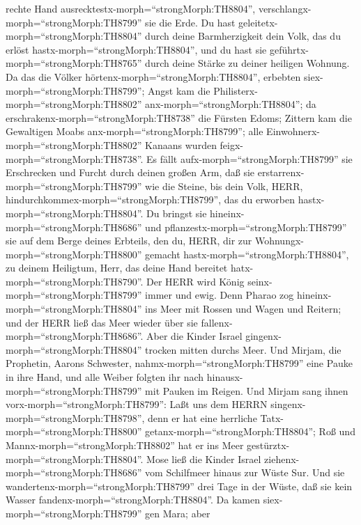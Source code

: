 rechte Hand ausrecktestx-morph=``strongMorph:TH8804'',
verschlangx-morph=``strongMorph:TH8799'' sie die Erde.  Du
hast geleitetx-morph=``strongMorph:TH8804'' durch deine Barmherzigkeit
dein Volk, das du erlöst hastx-morph=``strongMorph:TH8804'', und du hast
sie geführtx-morph=``strongMorph:TH8765'' durch deine Stärke zu deiner
heiligen Wohnung.  Da das die Völker
hörtenx-morph=``strongMorph:TH8804'', erbebten
siex-morph=``strongMorph:TH8799''; Angst kam die
Philisterx-morph=``strongMorph:TH8802''
anx-morph=``strongMorph:TH8804'';  da
erschrakenx-morph=``strongMorph:TH8738'' die Fürsten Edoms; Zittern kam
die Gewaltigen Moabs anx-morph=``strongMorph:TH8799''; alle
Einwohnerx-morph=``strongMorph:TH8802'' Kanaans wurden
feigx-morph=``strongMorph:TH8738''.  Es fällt
aufx-morph=``strongMorph:TH8799'' sie Erschrecken und Furcht durch
deinen großen Arm, daß sie erstarrenx-morph=``strongMorph:TH8799'' wie
die Steine, bis dein Volk, HERR,
hindurchkommex-morph=``strongMorph:TH8799'', das du erworben
hastx-morph=``strongMorph:TH8804''.  Du bringst sie
hineinx-morph=``strongMorph:TH8686'' und
pflanzestx-morph=``strongMorph:TH8799'' sie auf dem Berge deines
Erbteils, den du, HERR, dir zur Wohnungx-morph=``strongMorph:TH8800''
gemacht hastx-morph=``strongMorph:TH8804'', zu deinem Heiligtum, Herr,
das deine Hand bereitet hatx-morph=``strongMorph:TH8790''. 
Der HERR wird König seinx-morph=``strongMorph:TH8799'' immer und ewig.
 Denn Pharao zog hineinx-morph=``strongMorph:TH8804'' ins
Meer mit Rossen und Wagen und Reitern; und der HERR ließ das Meer wieder
über sie fallenx-morph=``strongMorph:TH8686''. Aber die Kinder Israel
gingenx-morph=``strongMorph:TH8804'' trocken mitten durchs Meer.
 Und Mirjam, die Prophetin, Aarons Schwester,
nahmx-morph=``strongMorph:TH8799'' eine Pauke in ihre Hand, und alle
Weiber folgten ihr nach hinausx-morph=``strongMorph:TH8799'' mit Pauken
im Reigen.  Und Mirjam sang ihnen
vorx-morph=``strongMorph:TH8799'': Laßt uns dem HERRN
singenx-morph=``strongMorph:TH8798'', denn er hat eine herrliche
Tatx-morph=``strongMorph:TH8800'' getanx-morph=``strongMorph:TH8804'';
Roß und Mannx-morph=``strongMorph:TH8802'' hat er ins Meer
gestürztx-morph=``strongMorph:TH8804''.  Mose ließ die
Kinder Israel ziehenx-morph=``strongMorph:TH8686'' vom Schilfmeer hinaus
zur Wüste Sur. Und sie wandertenx-morph=``strongMorph:TH8799'' drei Tage
in der Wüste, daß sie kein Wasser fandenx-morph=``strongMorph:TH8804''.
 Da kamen siex-morph=``strongMorph:TH8799'' gen Mara; aber
